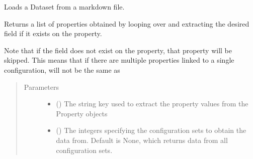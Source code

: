\documentclass[letterpaper,10pt,english]{sphinxmanual}
\begin{document}
\begin{fulllineitems}
\begin{fulllineitems}
\label{\detokenize{dataset:colabfit.tools.dataset.Dataset.from_markdown}}
\sphinxAtStartPar
Loads a Dataset from a markdown file.

\end{fulllineitems}


\begin{fulllineitems}
\label{\detokenize{dataset:colabfit.tools.dataset.Dataset.get_data}}
\sphinxAtStartPar
Returns a list of properties obtained by looping over  and
extracting the desired field if it exists on the property.

\sphinxAtStartPar
Note that if the field does not exist on the property, that property
will be skipped. This means that if there are multiple properties linked
to a single configuration,  will not be the same as
\begin{quote}\begin{description}
\item[{Parameters}] \leavevmode\begin{itemize}
\item {} 
\sphinxAtStartPar
{} () \textendash{} The string key used to extract the property values from the
Property objects

\item {} 
\sphinxAtStartPar
{} () \textendash{} 
\sphinxAtStartPar
The integers specifying the configuration sets to obtain the
data from. Default is None, which returns data from all
configuration sets.


\end{itemize}
\end{description}
\end{quote}
\end{fulllineitems}
\end{fulllineitems}
\end{document}
